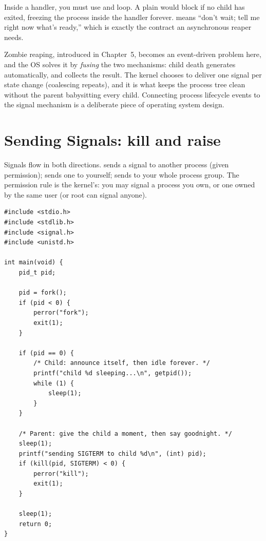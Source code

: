 \begin{ruleofthumb}
Inside a  handler, you must use  and loop. A plain  would
block if no child has exited, freezing the process inside the handler
forever.  means ``don't wait; tell me right now what's
ready,'' which is exactly the contract an asynchronous reaper needs.
\end{ruleofthumb}

\begin{osconcept}
Zombie reaping, introduced in Chapter~5, becomes an event-driven
problem here, and the OS solves it by \emph{fusing} the two mechanisms:
child death generates  automatically, and 
collects the result. The kernel chooses to deliver one signal per state
change (coalescing repeats), and it is what keeps the process tree
clean without the parent babysitting every child. Connecting process
lifecycle events to the signal mechanism is a deliberate piece of
operating system design.
\end{osconcept}

\section{Sending Signals: kill and raise}

Signals flow in both directions.  sends a signal
to another process (given permission);  sends one to
yourself;  sends to your whole process group. The
permission rule is the kernel's: you may signal a process you own, or
one owned by the same user (or root can signal anyone).

\begin{lstlisting}[caption={Sending signals, three ways.}]
#include <stdio.h>
#include <stdlib.h>
#include <signal.h>
#include <unistd.h>

int main(void) {
    pid_t pid;

    pid = fork();
    if (pid < 0) {
        perror("fork");
        exit(1);
    }

    if (pid == 0) {
        /* Child: announce itself, then idle forever. */
        printf("child %d sleeping...\n", getpid());
        while (1) {
            sleep(1);
        }
    }

    /* Parent: give the child a moment, then say goodnight. */
    sleep(1);
    printf("sending SIGTERM to child %d\n", (int) pid);
    if (kill(pid, SIGTERM) < 0) {
        perror("kill");
        exit(1);
    }

    sleep(1);
    return 0;
}
\end{lstlisting}

